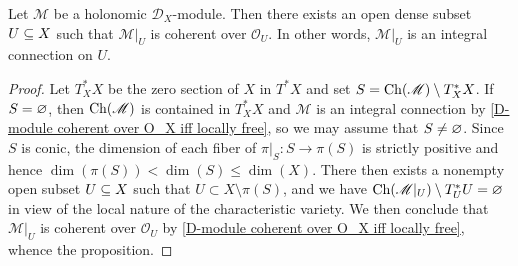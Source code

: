 \begin{proposition}\label{D-module holonomic generically locally free}
Let $\mathscr{M}$ be a holonomic $\mathscr{D}_X$-module. Then there exists an open dense subset $U\subseteq X$ such that $\mathscr{M}|_U$ is coherent over $\mathscr{O}_U$. In other words, $\mathscr{M}|_U$ is an integral connection on $U$.
\end{proposition}
\begin{proof}
Let $T^*_XX$ be the zero section of $X$ in $T^*X$ and set $S=\mathrm{Ch}(\mathscr{M})\setminus T_X^*X$. If $S=\varnothing$, then $\mathrm{Ch}(\mathscr{M})$ is contained in $T^*_XX$ and $\mathscr{M}$ is an integral connection by \cref{D-module coherent over O_X iff locally free}, so we may assume that $S\neq\varnothing$. Since $S$ is conic, the dimension of each fiber of $\pi|_S:S\to\pi(S)$ is strictly positive and hence $\dim(\pi(S))<\dim(S)\leq\dim(X)$. There then exists a nonempty open subset $U\subseteq X$ such that $U\subset X\setminus\pi(S)$, and we have $\mathrm{Ch}(\mathscr{M}|_U)\setminus T^*_UU=\varnothing$ in view of the local nature of the characteristic variety. We then conclude that $\mathscr{M}|_U$ is coherent over $\mathscr{O}_U$ by \cref{D-module coherent over O_X iff locally free}, whence the proposition.
\end{proof}

